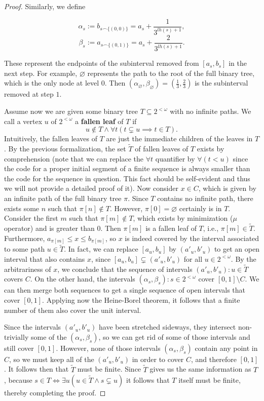 \documentclass[../main.tex]{memoir}
\begin{document}
\begin{proof}
  Similarly, we define

  \[ \alpha_s := b_{s \frown \{(0, 0)\}} = a_s + \frac{1}{3^{lh(s) + 1}}, \]
  \[ \beta_s := a_{s \frown \{(0, 1)\}} = a_s + \frac{2}{3^{lh(s) + 1}}. \]

  These represent the endpoints of the subinterval removed from $[a_s, b_s]$ in the next step. For example, $\varnothing$ represents the path to the root of the full binary tree, which is the only node at level $0$. Then $(\alpha_{\varnothing}, \beta_{\varnothing}) = (\frac13, \frac23)$ is the subinterval removed at step $1$.

  Assume now we are given some binary tree $T \subseteq 2^{<\omega}$ with no infinite paths. We call a vertex $u$ of $2^{<\omega}$ a \textbf{fallen leaf} of $T$ if
  \[u \not\in T \land \forall t (t \subsetneq u \implies t \in T). \]
  Intuitively, the fallen leaves of $T$ are just the immediate children of the leaves in $T$. By the previous formalization, the set $\widetilde{T}$ of fallen leaves of $T$ exists by  comprehension (note that we can replace the $\forall t$ quantifier by $\forall (t < u)$ since the code for a proper initial segment of a finite sequence is always smaller than the code for the sequence in question. This fact should be self-evident and thus we will not provide a detailed proof of it). Now consider $x \in C$, which is given by an infinite path of the full binary tree $\pi$. Since $T$ contains no infinite path, there exists some $n$ such that $\pi[n] \not\in T$. However, $\pi[0] = \varnothing$ certainly is in $T$. Consider the first $m$ such that $\pi[m] \not\in T$, which exists by minimization ($\mu$ operator) and is greater than $0$. Then $\pi[m]$ is a fallen leaf of $T$, i.e., $\pi[m] \in \widetilde{T}$. Furthermore, $a_{\pi[m]} \le x \le b_{\pi[m]}$, so $x$ is indeed covered by the interval associated to some path $u \in \widetilde{T}$. In fact, we can replace $[a_u, b_u]$ by $(a'_u, b'_u)$ to get an open interval that also contains $x$, since $[a_u, b_u] \subsetneq (a'_u, b'_u)$ for all $u \in 2^{<\omega}$. By the arbitrariness of $x$, we conclude that the sequence of intervals $(a'_u, b'_u): u \in \widetilde{T}$ covers $C$. On the other hand, the intervals $(\alpha_s, \beta_s): s \in 2^{<\omega}$ cover $[0, 1] \setminus C$. We can then merge both sequences to get a single sequence of open intervals that cover $[0, 1]$. Applying now the Heine-Borel theorem, it follows that a finite number of them also cover the unit interval.

  Since the intervals $(a'_u, b'_u)$ have been stretched sideways, they intersect non-trivially some of the $(\alpha_s, \beta_s)$, so we can get rid of some of those intervals and still cover $[0, 1]$. However, none of those intervals $(\alpha_s, \beta_s)$ contain any point in $C$, so we must keep all of the $(a'_u, b'_u)$ in order to cover $C$, and therefore $[0, 1]$. It follows then that $\widetilde{T}$ must be finite. Since $\widetilde{T}$ gives us the same information as $T$, because $s \in T \iff \exists u (u \in \widetilde{T} \land s \subsetneq u)$ it follows that $T$ itself must be finite, thereby completing the proof.
\end{proof}
\end{document}
